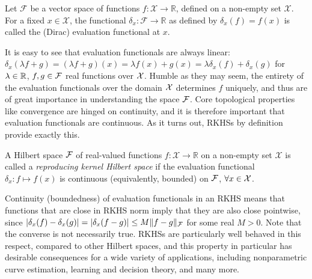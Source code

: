 \begin{definition}
	Let $\mathcal F$ be a vector space of functions $f:\mathcal X \rightarrow \mathbb R$, defined on a non-empty set $\mathcal X$. 
	For a fixed $x \in \mathcal X$, the functional $\delta_x:\mathcal F \rightarrow \mathbb R$ as defined by $\delta_x(f) = f(x)$ is called the (Dirac) evaluation functional at $x$.
\end{definition}

It is easy to see that evaluation functionals are always linear: $\delta_x(\lambda f + g) = (\lambda f + g)(x) = \lambda f(x) + g(x) = \lambda\delta_x(f) + \delta_x(g)$ for $\lambda\in\mathbb{R}$, $f,g\in{\mathcal F}$ real functions over ${\mathcal X}$.
Humble as they may seem, the entirety of the evaluation functionals over the domain ${\mathcal X}$ determines $f$ uniquely, and thus are of great importance in understanding the space ${\mathcal F}$.
Core topological properties like convergence are hinged on continuity, and it is therefore important that evaluation functionals are continuous.
As it turns out, RKHSs by definition provide exactly this.

\begin{definition}\label{def:rkhs}
	A Hilbert space ${\mathcal F}$ of real-valued functions $f:\mathcal X \rightarrow \mathbb R$ on a non-empty set $\mathcal X$ is called a \emph{reproducing kernel Hilbert space} if the evaluation functional $\delta_x: f \mapsto f(x)$ is continuous (equivalently, bounded) on ${\mathcal F}$, $\forall x \in {\mathcal X}$. 
\end{definition}

Continuity (boundedness) of evaluation functionals in an RKHS means that functions that are close in RKHS norm imply that they are also close pointwise, since $\vert \delta_x(f) - \delta_x(g) \vert = \vert \delta_x(f-g) \vert \leq M\Vert f-g \Vert_{\mathcal F}$ for some real $M>0$.
Note that the converse is not necessarily true.
RKHSs are particularly well behaved in this respect, compared to other Hilbert spaces, and this property in particular has desirable consequences for a wide variety of applications, including nonparametric curve estimation, learning and decision theory, and many more.

